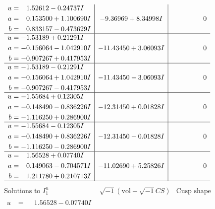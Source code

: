 \documentclass[1p]{elsarticle_modified}
\theoremstyle{definition}
\newcommand{\I}{\sqrt{-1}}
\begin{document}
$$\begin{array}{c|c|c}
\begin{aligned}
u &= \phantom{-}1.52612 - 0.24737 I \\
a &= \phantom{-}0.153500 + 1.100690 I \\
b &= \phantom{-}0.833157 - 0.473629 I\end{aligned}
 & -9.36969 + 8.34998 I & \phantom{-0.000000 } 0 \\ \hline\begin{aligned}
u &= -1.53189 + 0.21291 I \\
a &= -0.156064 - 1.042910 I \\
b &= -0.907267 + 0.417953 I\end{aligned}
 & -11.43450 + 3.06093 I & \phantom{-0.000000 } 0 \\ \hline\begin{aligned}
u &= -1.53189 - 0.21291 I \\
a &= -0.156064 + 1.042910 I \\
b &= -0.907267 - 0.417953 I\end{aligned}
 & -11.43450 - 3.06093 I & \phantom{-0.000000 } 0 \\ \hline\begin{aligned}
u &= -1.55684 + 0.12305 I \\
a &= -0.148490 - 0.836226 I \\
b &= -1.116250 + 0.286900 I\end{aligned}
 & -12.31450 + 0.01828 I & \phantom{-0.000000 } 0 \\ \hline\begin{aligned}
u &= -1.55684 - 0.12305 I \\
a &= -0.148490 + 0.836226 I \\
b &= -1.116250 - 0.286900 I\end{aligned}
 & -12.31450 - 0.01828 I & \phantom{-0.000000 } 0 \\ \hline\begin{aligned}
u &= \phantom{-}1.56528 + 0.07740 I \\
a &= \phantom{-}0.149063 - 0.704571 I \\
b &= \phantom{-}1.211780 + 0.210713 I\end{aligned}
 & -11.02690 + 5.25826 I & \phantom{-0.000000 } 0\\
 \hline 
 \end{array}$$\newpage$$\begin{array}{c|c|c}  
\text{Solutions to }I^u_{1}& \I (\text{vol} + \sqrt{-1}CS) & \text{Cusp shape}\\
 \hline 
\begin{aligned}
u &= \phantom{-}1.56528 - 0.07740 I \\

\end{aligned}
\end{array}$$
\end{document}
